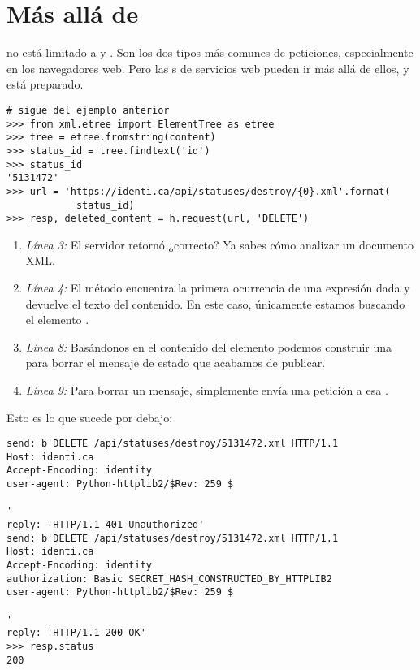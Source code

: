 \section{Más allá de }

 no está limitado a  y . Son los dos tipos más comunes de peticiones, especialmente en los navegadores web. Pero las s de servicios web pueden ir más allá de ellos, y  está preparado.

\noindent\begin{minipage}{\textwidth}
\begin{lstlisting}[mathescape=True]
# sigue del ejemplo anterior
>>> from xml.etree import ElementTree as etree
>>> tree = etree.fromstring(content)
>>> status_id = tree.findtext('id')
>>> status_id
'5131472'
>>> url = 'https://identi.ca/api/statuses/destroy/{0}.xml'.format(
            status_id)
>>> resp, deleted_content = h.request(url, 'DELETE')          
\end{lstlisting}
\end{minipage}

\begin{enumerate}

\item \emph{Línea 3:} El servidor retornó  ¿correcto? Ya sabes cómo analizar un documento XML.

\item \emph{Línea 4:} El método  encuentra la primera ocurrencia de una expresión dada y devuelve el texto del contenido. En este caso, únicamente estamos buscando el elemento .

\item \emph{Línea 8:} Basándonos en el contenido del elemento  podemos construir una  para borrar el mensaje de estado que acabamos de publicar.

\item \emph{Línea 9:} Para borrar un mensaje, simplemente envía una petición  a esa .

\end{enumerate}

Esto es lo que sucede por debajo:

\noindent\begin{minipage}{\textwidth}
\begin{lstlisting}[mathescape=True]
send: b'DELETE /api/statuses/destroy/5131472.xml HTTP/1.1
Host: identi.ca
Accept-Encoding: identity
user-agent: Python-httplib2/$Rev: 259 $

'
reply: 'HTTP/1.1 401 Unauthorized'        
send: b'DELETE /api/statuses/destroy/5131472.xml HTTP/1.1
Host: identi.ca
Accept-Encoding: identity
authorization: Basic SECRET_HASH_CONSTRUCTED_BY_HTTPLIB2
user-agent: Python-httplib2/$Rev: 259 $

'
reply: 'HTTP/1.1 200 OK'                               
>>> resp.status
200
\end{lstlisting}
\end{minipage}

